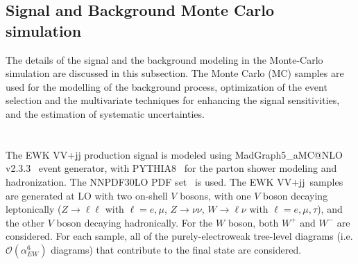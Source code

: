 \subsection{Signal and Background Monte Carlo simulation}
\label{subsec:sigbgMC}
The details of the signal and the background modeling in the Monte-Carlo simulation are discussed in this subsection.
The Monte Carlo (MC) samples are used for the modelling of the background process, optimization of the event selection and the multivariate techniques for enhancing the signal sensitivities, and the estimation of systematic uncertainties.
\\ \\
\noindent\textbf{} \\ 
The EWK VV+jj production signal is modeled using MadGraph5\_aMC@NLO v2.3.3~\cite{Alwall:2014hca} event generator, with PYTHIA8~\cite{Sjostrand:2007gs} for the parton shower modeling and hadronization. The \textsc{NNPDF30LO} PDF set~\cite{Ball:2012cx} is used. 
The EWK VV+jj\ samples are generated at LO with two on-shell $V$ bosons, with one $V$ boson decaying leptonically
($Z\to \ell\ell$ with $\ell = e, \mu$, $Z\to \nu\nu$, $W\to \ell \nu$ with $\ell= e, \mu, \tau$),
and the other $V$ boson decaying hadronically. For the $W$ boson, both $W^{+}$ and $W^{-}$ are considered.
For each sample, all of the purely-electroweak tree-level diagrams (i.e. $\mathcal{O}(\alpha_{EW}^6)$ diagrams) that contribute to the final state are considered.



